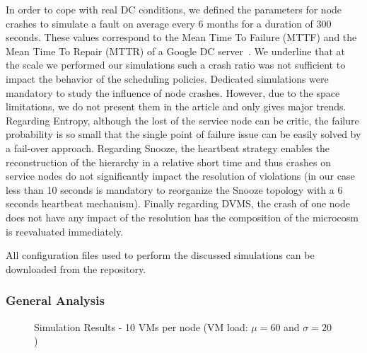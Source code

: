 In order to cope with real DC conditions, we defined the parameters
for node crashes to simulate a fault on average every 6 months for a
duration of 300 seconds. These values correspond to the Mean Time To
Failure (MTTF) and the Mean Time To Repair (MTTR) of a Google DC
server~\cite[pp. 107-108]{datacenterAsComputer}. We underline that at
the scale we performed our simulations such a crash ratio was not
sufficient to impact the behavior of the scheduling policies.
Dedicated simulations were mandatory to study the influence of node
crashes. However, due to the space limitations, we do not present them
in the article and only gives major trends. Regarding Entropy,
although the lost of the service node can be critic, the failure
probability is so small that the single point of failure issue can be
easily solved by a fail-over approach. Regarding Snooze, the heartbeat
strategy enables the reconstruction of the hierarchy in a relative
short time and thus crashes on service nodes do not significantly
impact the resolution of violations (in our case less than 10 seconds
is mandatory to reorganize the Snooze topology with a 6 seconds
heartbeat mechanism). Finally regarding DVMS, the crash of one node
does not have any impact of the resolution has the composition of the
microcosm is reevaluated immediately.


All configuration files used to perform the discussed simulations can
be downloaded from the \vmps repository.

\subsubsection{General  Analysis}
\label{subsec:general-comparison}

\begin{figure}
\subcapcentertrue
{}
\caption{Simulation Results - 10 VMs per node (VM load: $\mu=60$ and $\sigma=20$)}
\label{fig:simulation-overview}
\end{figure}

